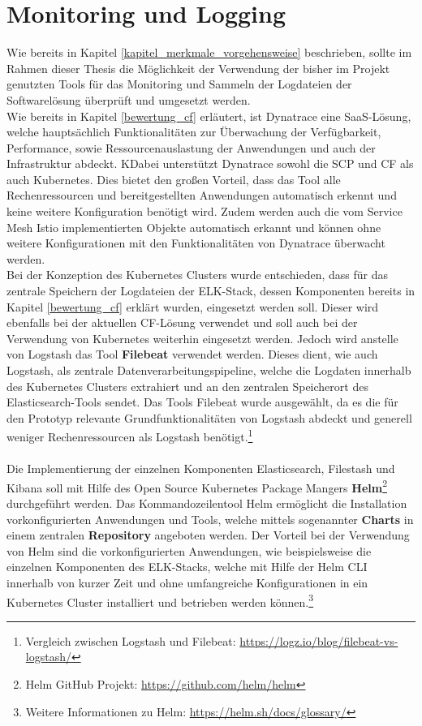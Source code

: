 \section{Monitoring und Logging}
\label{Konzeption_Monitoring_Logging}
Wie bereits in Kapitel \ref{kapitel_merkmale_vorgehensweise} beschrieben, sollte im Rahmen dieser Thesis die Möglichkeit der Verwendung der bisher im Projekt genutzten Tools für das Monitoring und Sammeln der Logdateien der Softwarelösung überprüft und umgesetzt werden.\\
Wie bereits in Kapitel \ref{bewertung_cf} erläutert, ist Dynatrace eine \ac{SaaS}-Lösung, welche hauptsächlich Funktionalitäten zur Überwachung der Verfügbarkeit, Performance, sowie Ressourcenauslastung der Anwendungen und auch der Infrastruktur abdeckt. KDabei unterstützt Dynatrace sowohl die \ac{SCP} und \ac{CF} als auch Kubernetes. Dies bietet den großen Vorteil, dass das Tool alle Rechenressourcen und bereitgestellten Anwendungen automatisch erkennt und keine weitere Konfiguration benötigt wird. Zudem werden auch die vom Service Mesh Istio implementierten Objekte automatisch erkannt und können ohne weitere Konfigurationen mit den Funktionalitäten von Dynatrace überwacht werden.\autocite[Vgl.][]{DynatraceLLC.2019}
\\
Bei der Konzeption des Kubernetes Clusters wurde entschieden, dass für das zentrale Speichern der Logdateien der ELK-Stack, dessen Komponenten bereits in Kapitel \ref{bewertung_cf} erklärt wurden, eingesetzt werden soll. Dieser wird ebenfalls bei der aktuellen \ac{CF}-Lösung verwendet und soll auch bei der Verwendung von Kubernetes weiterhin eingesetzt werden. Jedoch wird anstelle von Logstash das Tool \textbf{Filebeat} verwendet werden. Dieses dient, wie auch Logstash, als zentrale Datenverarbeitungspipeline, welche die Logdaten innerhalb des Kubernetes Clusters extrahiert und an den zentralen Speicherort des Elasticsearch-Tools sendet. Das Tools Filebeat wurde ausgewählt, da es die für den Prototyp relevante Grundfunktionalitäten von Logstash abdeckt und generell weniger Rechenressourcen als Logstash benötigt.\footnote{Vergleich zwischen Logstash und Filebeat: \url{https://logz.io/blog/filebeat-vs-logstash/}}\\ 
\\
Die Implementierung der einzelnen Komponenten Elasticsearch, Filestash und Kibana soll mit Hilfe des Open Source Kubernetes Package Mangers \textbf{Helm}\footnote{Helm GitHub Projekt: \url{https://github.com/helm/helm}} durchgeführt werden. Das Kommandozeilentool Helm ermöglicht die Installation vorkonfigurierten Anwendungen und Tools, welche mittels sogenannter \textbf{Charts} in einem zentralen \textbf{Repository} angeboten werden.\autocite[Vgl.][]{HelmAuthors.2020} 
Der Vorteil bei der Verwendung von Helm sind die vorkonfigurierten Anwendungen, wie beispielsweise die einzelnen Komponenten des ELK-Stacks, welche mit Hilfe der Helm \ac{CLI} innerhalb von kurzer Zeit und ohne umfangreiche Konfigurationen in ein Kubernetes Cluster installiert und betrieben werden können.\footnote{Weitere Informationen zu Helm: \url{https://helm.sh/docs/glossary/}}
